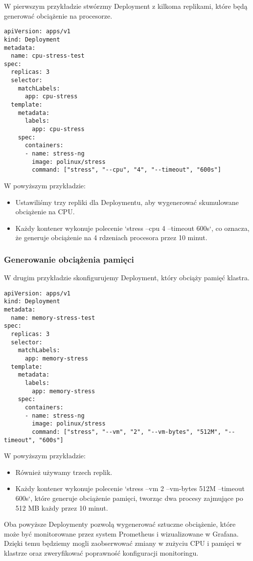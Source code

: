 \documentclass{article}
\begin{document}
W pierwszym przykładzie stwórzmy Deployment z kilkoma replikami, które będą generować obciążenie na procesorze.

\begin{lstlisting}
apiVersion: apps/v1
kind: Deployment
metadata:
  name: cpu-stress-test
spec:
  replicas: 3
  selector:
    matchLabels:
      app: cpu-stress
  template:
    metadata:
      labels:
        app: cpu-stress
    spec:
      containers:
      - name: stress-ng
        image: polinux/stress
        command: ["stress", "--cpu", "4", "--timeout", "600s"]
\end{lstlisting}

W powyższym przykładzie:
\begin{itemize}
  \item Ustawiliśmy trzy repliki dla Deploymentu, aby wygenerować skumulowane obciążenie na CPU.
  \item Każdy kontener wykonuje polecenie `stress --cpu 4 --timeout 600s`, co oznacza, że generuje obciążenie na 4 rdzeniach procesora przez 10 minut.
\end{itemize}

\subsubsection{Generowanie obciążenia pamięci}

W drugim przykładzie skonfigurujemy Deployment, który obciąży pamięć klastra. 

\begin{lstlisting}
apiVersion: apps/v1
kind: Deployment
metadata:
  name: memory-stress-test
spec:
  replicas: 3
  selector:
    matchLabels:
      app: memory-stress
  template:
    metadata:
      labels:
        app: memory-stress
    spec:
      containers:
      - name: stress-ng
        image: polinux/stress
        command: ["stress", "--vm", "2", "--vm-bytes", "512M", "--timeout", "600s"]
\end{lstlisting}

W powyższym przykładzie:
\begin{itemize}
  \item Również używamy trzech replik.
  \item Każdy kontener wykonuje polecenie `stress --vm 2 --vm-bytes 512M --timeout 600s`, które generuje obciążenie pamięci, tworząc dwa procesy zajmujące po 512 MB każdy przez 10 minut.
\end{itemize}

Oba powyższe Deploymenty pozwolą wygenerować sztuczne obciążenie, które może być monitorowane przez system Prometheus i wizualizowane w Grafana. Dzięki temu będziemy mogli zaobserwować zmiany w zużyciu CPU i pamięci w klastrze oraz zweryfikować poprawność konfiguracji monitoringu.
\end{document}
